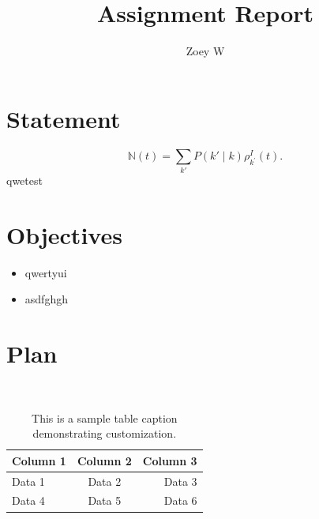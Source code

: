 \documentclass[12pt]{article}
\begin{document}
 
 
\title{Assignment Report}
\author{Zoey W}
\maketitle

\section*{Statement}
\lipsum[1-1]
\begin{equation} %
    \mathbb{N}(t)=\sum_{k'}P(k'\mid k)\rho^{I}_{k^{'}}(t).
\end{equation}
\lipsum[2-2]
qwetest\cite{wei2022chain}

\section*{Objectives}
\lipsum[3-3]
\begin{itemize} %
    \item qwertyui
    \item asdfghgh
\end{itemize}

\section*{Plan}
\lipsum[4-4]\\ 
\begin{table}[h] %
    \vspace{2pt} 
    \centering
    \begin{tabular}{lcr} 
        \toprule
        Column 1 & Column 2 & Column 3 \\
        \midrule
        Data 1   & Data 2   & Data 3   \\
        Data 4   & Data 5   & Data 6   \\
        \bottomrule
    \end{tabular} \label{tab1}
    \caption{This is a sample table caption demonstrating customization.}
\end{table}
\end{document}

